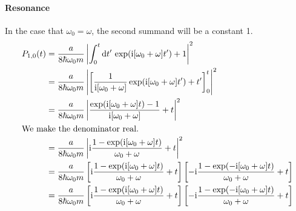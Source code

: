 \documentclass[11pt, english, fleqn, DIV=15, headinclude, BCOR=1.5cm]{scrartcl}
\begin{document}
\paragraph{Resonance}

In the
case that $\omega_0 = \omega$, the second summand will be a constant 1.
\begin{align*}
    P_{1,0}(t)
    &= \frac{a}{8\hbar\omega_0 m} \abs{\int_{0}^t \dif t' \,
    \exp(\iup [\omega_0+\omega] t') + 1}^2 \\
    &= \frac{a}{8\hbar\omega_0 m} \abs{\sbr{
        \frac1{\iup [\omega_0+\omega]} \exp(\iup [\omega_0+\omega] t') +
    t'}_{0}^t}^2 \\
    &= \frac{a}{8\hbar\omega_0 m} \abs{
    \frac{\exp(\iup [\omega_0+\omega] t) - 1}{\iup [\omega_0+\omega]} +
    t}^2 \\
    \intertext{%
        We make the denominator real.
    }
    &= \frac{a}{8\hbar\omega_0 m} \abs{
    \iup \frac{1 - \exp(\iup [\omega_0+\omega] t)}{\omega_0+\omega} +
    t}^2 \\
    &= \frac{a}{8\hbar\omega_0 m}
    \sbr{ \iup \frac{1 - \exp(\iup [\omega_0+\omega] t)}{\omega_0+\omega} + t}
    \sbr{- \iup \frac{1 - \exp(-\iup [\omega_0+\omega] t)}{\omega_0+\omega} + t}
    \\
    &= \frac{a}{8\hbar\omega_0 m}
    \sbr{ \iup \frac{1 - \exp(\iup [\omega_0+\omega] t)}{\omega_0+\omega} + t}
    \sbr{- \iup \frac{1 - \exp(-\iup [\omega_0+\omega] t)}{\omega_0+\omega} + t}
    \\
\end{align*}

\end{document}
